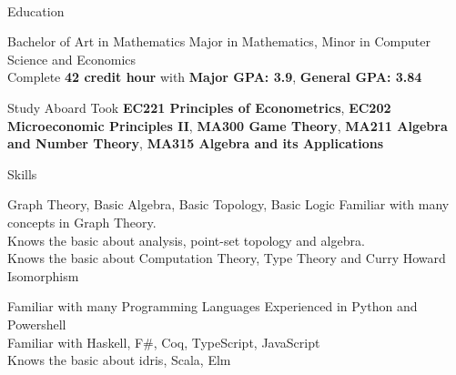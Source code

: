 \documentclass[]{resume-knyte}
\begin{document}



\begin{subheader}{1}
    \\

\end{subheader}

\begin{topic}{Education}


    {Bachelor of Art in Mathematics}
    {Major in Mathematics, Minor in Computer Science and Economics\\
    Complete \textbf{42 credit hour} with \textbf{Major GPA: 3.9}, \textbf{General GPA: 3.84}}


    {Study Aboard}
    {Took
    \textbf{EC221 Principles of Econometrics},
    \textbf{EC202 Microeconomic Principles II},
    \textbf{MA300 Game Theory},
    \textbf{MA211 Algebra and Number Theory},
    \textbf{MA315 Algebra and its Applications}
    }

\end{topic}



\begin{topic}{Skills}


    {Graph Theory, Basic Algebra, Basic Topology, Basic Logic}
    { Familiar with many concepts in Graph Theory.\\
    Knows the basic about analysis, point-set topology and algebra.\\
    Knows the basic about Computation Theory, Type Theory and Curry Howard Isomorphism }

    {Familiar with many Programming Languages}
    {Experienced in Python and Powershell\\
    Familiar with Haskell, F\#, Coq, TypeScript, JavaScript\\
    Knows the basic about idris, Scala, Elm}


    \\ %
\end{topic}
\end{document}
